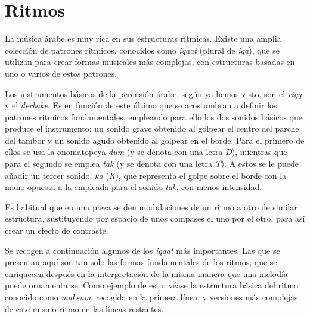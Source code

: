 \section{Ritmos}

La música árabe es muy rica en sus estructuras rítmicas. Existe una amplia colección de patrones rítmicos, conocidos como \emph{iqaat} (plural de \emph{iqa}), que se utilizan para crear formas musicales más complejas, con estructuras basadas en uno o varios de estos patrones.

Los instrumentos básicos de la percusión árabe, según ya hemos visto, son el \emph{riqq} y el \emph{derbake}. Es en función de este último que se acostumbran a definir los patrones rítmicos fundamentales, empleando para ello los dos sonidos básicos que produce el instrumento: un sonido grave obtenido al golpear el centro del parche del tambor y un sonido agudo obtenido al golpear en el borde. Para el primero de ellos se usa la onomatopeya \emph{dum} (y se denota con una letra \emph{D}), mientras que para el segundo se emplea \emph{tak} (y se denota con una letra \emph{T}). A estos se le puede añadir un tercer sonido, \emph{ka} (\emph{K}), que representa el golpe sobre el borde con la mano opuesta a la empleada para el sonido \emph{tak}, con menos intensidad.

Es habitual que en una pieza se den modulaciones de un ritmo a otro de similar estructura, sustituyendo por espacio de unos compases el uno por el otro, para así crear un efecto de contraste.

Se recogen a continuación algunos de los \emph{iqaat} más importantes. Las que se presentan aquí son tan solo las formas fundamentales de los ritmos, que se enriquecen después en la interpretación de la misma manera que una melodía puede ornamentarse. Como ejemplo de esto, véase la estructura básica del ritmo conocido como \emph{maksum}, recogida en la primera línea, y versiones más complejas de este mismo ritmo en las líneas restantes.

\begin{center}
\end{center}

